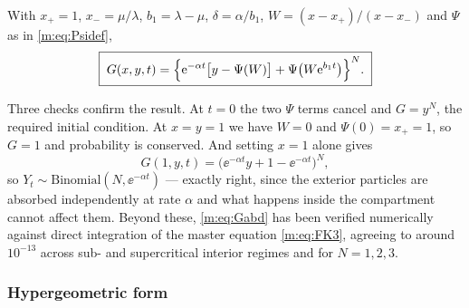 \begin{proposition}
\label{m:prop:Gabd}
With $x_+=1$, $x_-=\mu/\lambda$, $b_1 = \lambda-\mu$, $\delta = \alpha/b_1$,
$W = (x-x_+)/(x-x_-)$ and $\Psi$ as in \cref{m:eq:Psidef},
\begin{equation}
\label{m:eq:Gabd}
\boxed{\;
G(x,y,t) = \Bigl\{\mathrm{e}^{-\alpha t}\bigl[y-\Psi(W)\bigr] + \Psi\bigl(W\mathrm{e}^{b_1t}\bigr)\Bigr\}^{N}. \;}
\end{equation}
\end{proposition}

Three checks confirm the result. At $t=0$ the two $\Psi$ terms cancel and $G=y^N$,
the required initial condition. At $x=y=1$ we have $W=0$ and $\Psi(0)=x_+=1$, so
$G=1$ and probability is conserved. And setting $x=1$ alone gives
\begin{equation*}
G(1,y,t) = \bigl(\ee^{-\alpha t}y + 1-\ee^{-\alpha t}\bigr)^N,
\end{equation*}
so $Y_t\sim\text{Binomial}(N,\ee^{-\alpha t})$ --- exactly right, since the
exterior particles are absorbed independently at rate $\alpha$ and what happens
inside the compartment cannot affect them. Beyond these, \cref{m:eq:Gabd} has been
verified numerically against direct integration of the master equation
\cref{m:eq:FK3}, agreeing to around $10^{-13}$ across sub- and supercritical interior
regimes and for $N=1,2,3$.

\subsubsection*{Hypergeometric form}

